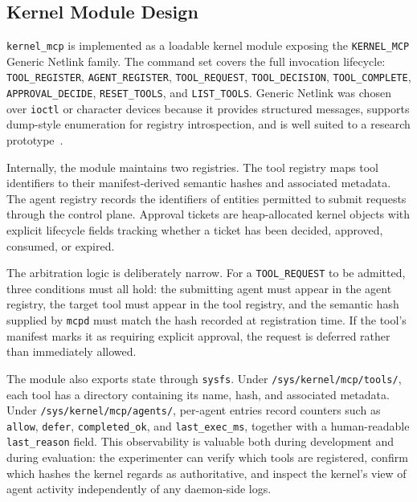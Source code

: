\subsection{Kernel Module Design}

\texttt{kernel\_mcp} is implemented as a loadable kernel module exposing the \texttt{KERNEL\_MCP} Generic Netlink family.
The command set covers the full invocation lifecycle: \texttt{TOOL\_REGISTER}, \texttt{AGENT\_REGISTER}, \texttt{TOOL\_REQUEST}, \texttt{TOOL\_DECISION}, \texttt{TOOL\_COMPLETE}, \texttt{APPROVAL\_DECIDE}, \texttt{RESET\_TOOLS}, and \texttt{LIST\_TOOLS}.
Generic Netlink was chosen over \texttt{ioctl} or character devices because it provides structured messages, supports dump-style enumeration for registry introspection, and is well suited to a research prototype~\cite{netlink2026}.

Internally, the module maintains two registries.
The tool registry maps tool identifiers to their manifest-derived semantic hashes and associated metadata.
The agent registry records the identifiers of entities permitted to submit requests through the control plane.
Approval tickets are heap-allocated kernel objects with explicit lifecycle fields tracking whether a ticket has been decided, approved, consumed, or expired.

The arbitration logic is deliberately narrow.
For a \texttt{TOOL\_REQUEST} to be admitted, three conditions must all hold: the submitting agent must appear in the agent registry, the target tool must appear in the tool registry, and the semantic hash supplied by \texttt{mcpd} must match the hash recorded at registration time.
If the tool's manifest marks it as requiring explicit approval, the request is deferred rather than immediately allowed.

The module also exports state through \texttt{sysfs}.
Under \texttt{/sys/kernel/mcp/tools/}, each tool has a directory containing its name, hash, and associated metadata.
Under \texttt{/sys/kernel/mcp/agents/}, per-agent entries record counters such as \texttt{allow}, \texttt{defer}, \texttt{completed\_ok}, and \texttt{last\_exec\_ms}, together with a human-readable \texttt{last\_reason} field.
This observability is valuable both during development and during evaluation: the experimenter can verify which tools are registered, confirm which hashes the kernel regards as authoritative, and inspect the kernel's view of agent activity independently of any daemon-side logs.



